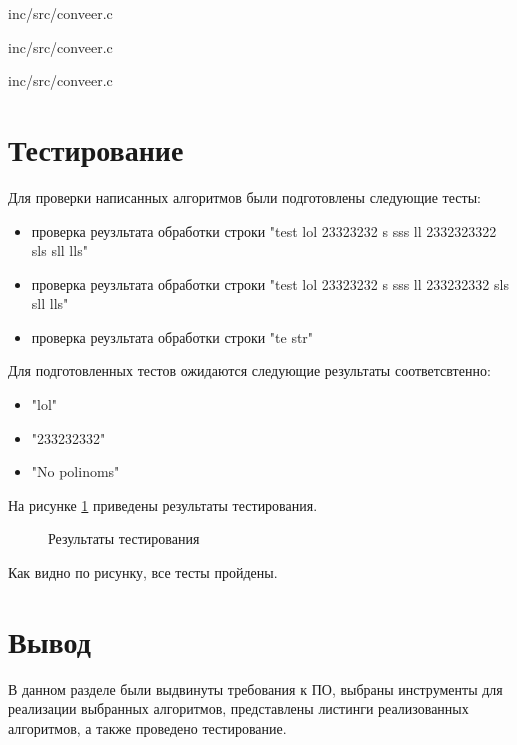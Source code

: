\newpage
\begin{lstinputlisting}[
	caption={Алгоритм первой ленты конвеера},
	label={conveer1},
	style={c},
	linerange={1-25},
	]{inc/src/conveer.c}
\end{lstinputlisting}

\newpage
\begin{lstinputlisting}[
	caption={Алгоритм второй ленты конвеера},
	label={conveer2},
	style={c},
	linerange={27-51},
	]{inc/src/conveer.c}
\end{lstinputlisting}

\newpage
\begin{lstinputlisting}[
	caption={Алгоритм третей ленты конвеера},
	label={conveer3},
	style={c},
	linerange={53-79},
	]{inc/src/conveer.c}
\end{lstinputlisting}

\section{Тестирование}
Для проверки написанных алгоритмов были подготовлены следующие тесты:
\begin{itemize}
	\item проверка реузльтата обработки строки "test lol 23323232 s sss ll 2332323322 sls sll lls"
	\item проверка реузльтата обработки строки "test lol 23323232 s sss ll 233232332 sls sll lls"
	\item проверка реузльтата обработки строки "te str"
\end{itemize}

Для подготовленных тестов ожидаются следующие результаты соответсвтенно:
\begin{itemize}
	\item "lol"
	\item "233232332"
	\item "No polinoms"
\end{itemize}

На рисунке \ref{tests} приведены результаты тестирования.

\begin{figure}[h]
	\caption{Результаты тестирования}
	\label{tests}
\end{figure}

Как видно по рисунку, все тесты пройдены.

\section{Вывод}
В данном разделе были выдвинуты требования к ПО, выбраны инструменты для реализации выбранных алгоритмов, представлены листинги реализованных алгоритмов, а также проведено тестирование.